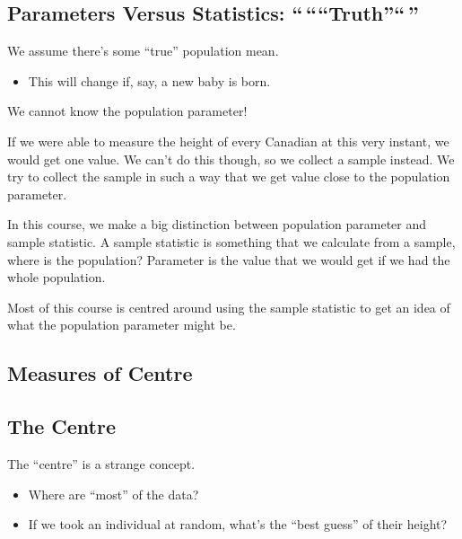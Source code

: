 \documentclass[
  letterpaper,
  DIV=11,
  numbers=noendperiod]{scrreprt}
\providecommand{\tightlist}{%
  \setlength{\itemsep}{0pt}\setlength{\parskip}{0pt}}\usepackage{longtable,booktabs,array}
\begin{document}
\hypertarget{parameters-versus-statistics-truth}{%
\subsection{\texorpdfstring{Parameters Versus Statistics:
``\,````Truth''``\,''}{Parameters Versus Statistics: ``\,``\,``Truth''\,``\,''}}\label{parameters-versus-statistics-truth}}

We assume there's some ``true'' population mean.

\begin{itemize}
\tightlist
\item
  This will change if, say, a new baby is born.
\end{itemize}

We cannot know the population parameter!

If we were able to measure the height of every Canadian at this very
instant, we would get one value. We can't do this though, so we collect
a sample instead. We try to collect the sample in such a way that we get
value close to the population parameter.

In this course, we make a big distinction between population parameter
and sample statistic. A sample statistic is something that we calculate
from a sample, where is the population? Parameter is the value that we
would get if we had the whole population.

Most of this course is centred around using the sample statistic to get
an idea of what the population parameter might be.

\hypertarget{measures-of-centre}{%
\subsection{Measures of Centre}\label{measures-of-centre}}

\hypertarget{the-centre}{%
\subsection{The Centre}\label{the-centre}}

The ``centre'' is a strange concept.

\begin{itemize}
\tightlist
\item
  Where are ``most'' of the data?
\item
  If we took an individual at random, what's the ``best guess'' of their
  height?
\end{itemize}
\end{document}
